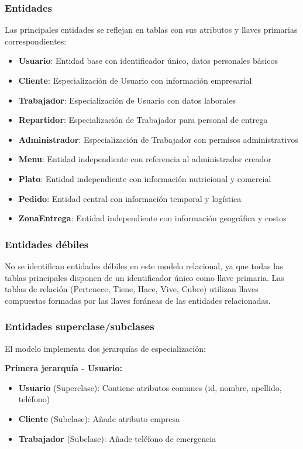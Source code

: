 \documentclass[12pt,a4paper]{article}
\begin{document}
\subsubsection{Entidades}
Las principales entidades se reflejan en tablas con sus atributos y llaves primarias correspondientes:
\begin{itemize}
    \item \textbf{Usuario}: Entidad base con identificador único, datos personales básicos
    \item \textbf{Cliente}: Especialización de Usuario con información empresarial
    \item \textbf{Trabajador}: Especialización de Usuario con datos laborales
    \item \textbf{Repartidor}: Especialización de Trabajador para personal de entrega
    \item \textbf{Administrador}: Especialización de Trabajador con permisos administrativos
    \item \textbf{Menu}: Entidad independiente con referencia al administrador creador
    \item \textbf{Plato}: Entidad independiente con información nutricional y comercial
    \item \textbf{Pedido}: Entidad central con información temporal y logística
    \item \textbf{ZonaEntrega}: Entidad independiente con información geográfica y costos
\end{itemize}

\subsubsection{Entidades débiles}
No se identifican entidades débiles en este modelo relacional, ya que todas las tablas principales disponen de un identificador único como llave primaria. Las tablas de relación (Pertenece, Tiene, Hace, Vive, Cubre) utilizan llaves compuestas formadas por las llaves foráneas de las entidades relacionadas.

\subsubsection{Entidades superclase/subclases}
El modelo implementa dos jerarquías de especialización:

\textbf{Primera jerarquía - Usuario:}
\begin{itemize}
    \item \textbf{Usuario} (Superclase): Contiene atributos comunes (id, nombre, apellido, teléfono)
    \item \textbf{Cliente} (Subclase): Añade atributo empresa
    \item \textbf{Trabajador} (Subclase): Añade teléfono de emergencia
\end{itemize}
\end{document}
